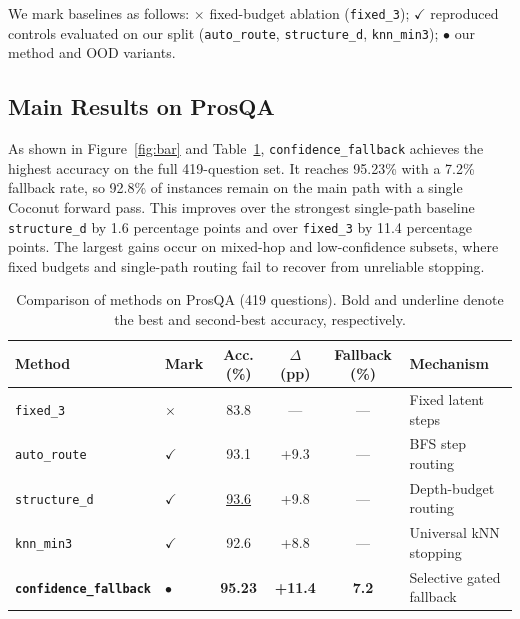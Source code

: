 \documentclass{article}
\begin{document}
We mark baselines as follows: $\times$ fixed-budget ablation (\texttt{fixed\_3}); $\checkmark$ reproduced controls evaluated on our split (\texttt{auto\_route}, \texttt{structure\_d}, \texttt{knn\_min3}); $\bullet$ our method and OOD variants.

\subsection{Main Results on ProsQA}

As shown in Figure~\ref{fig:bar} and Table~\ref{tab:main}, \texttt{confidence\_fallback} achieves the highest accuracy on the full 419-question set. It reaches 95.23\% with a 7.2\% fallback rate, so 92.8\% of instances remain on the main path with a single Coconut forward pass. This improves over the strongest single-path baseline \texttt{structure\_d} by 1.6 percentage points and over \texttt{fixed\_3} by 11.4 percentage points. The largest gains occur on mixed-hop and low-confidence subsets, where fixed budgets and single-path routing fail to recover from unreliable stopping.



\begin{table}[t]
\caption{Comparison of methods on ProsQA (419 questions). Bold and underline denote the best and second-best accuracy, respectively.}
\label{tab:main}
\vspace{1mm}
\begin{center}
\small
\begin{tabular}{l l c c c l}
\toprule
\textbf{Method} & \textbf{Mark} & \textbf{Acc. (\%)} & \textbf{$\Delta$ (pp)} & \textbf{Fallback (\%)} & \textbf{Mechanism} \\
\midrule
\texttt{fixed\_3} & $\times$ & 83.8 & --- & --- & Fixed latent steps \\
\texttt{auto\_route} & $\checkmark$ & 93.1 & +9.3 & --- & BFS step routing \\
\texttt{structure\_d} & $\checkmark$ & \underline{93.6} & +9.8 & --- & Depth-budget routing \\
\texttt{knn\_min3} & $\checkmark$ & 92.6 & +8.8 & --- & Universal kNN stopping \\
\textbf{\texttt{confidence\_fallback}} & $\bullet$ & \textbf{95.23} & \textbf{+11.4} & \textbf{7.2} & Selective gated fallback \\
\bottomrule
\end{tabular}
\end{center}
\end{table}
\end{document}
